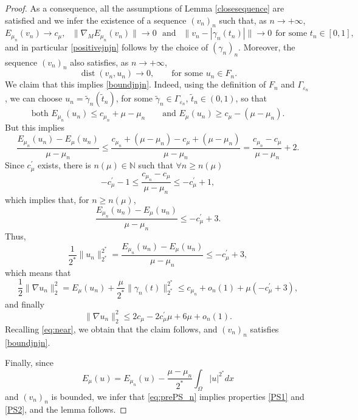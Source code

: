 \documentclass[10pt]{article}
\newcommand{\eps}{\varepsilon}
\DeclareMathOperator{\dist}{dist}
\theoremstyle{definition}
\numberwithin{equation}{section}
\begin{document}
\begin{proof}
As a consequence, all the assumptions of Lemma \ref{closesequence} are satisfied and 
we infer the existence of a sequence $(v_{n})_{n}$ such that, as $n\to+\infty$,
\begin{equation}\label{eq:prePS_n}
E_{\mu_n}(v_{n})\to c_{\mu}, \ \ \ \|\nabla_M E_{\mu_n}(v_{n})\|\to 0 \ \ \ \text{and   } \ \ \|v_{n}-|\gamma_{n}(t_{n})|\| \to 0 \ \ \text{for some } t_{n}\in[0,1],
\end{equation}
and in particular \ref{positivejnjn} follows by the choice of $(\gamma_n)_n$. Moreover, 
the sequence $(v_n)_n$ also satisfies, as $n\to+\infty$,
\begin{equation}\label{eq:near}
\dist(v_{n},u_{n})\to 0,\qquad\text{for some }u_n\in F_n.
\end{equation}
We claim that this implies \ref{boundjnjn}. Indeed, using the  
definition of $F_n$ and $\Gamma_{\eps_n}$, we can choose $u_n=\tilde\gamma_n(\tilde t_n)$, for some 
$\tilde\gamma_n\in \Gamma_{\eps_n}$, $\tilde t_{n}\in(0,1)$, so that
\begin{equation}\label{eq:near2}
\text{both } E_{\mu_n}(u_n) \le c_{\mu_n}+\mu - \mu_n\qquad
\text{and } E_{\mu}(u_n) \ge c_{\mu}-(\mu - \mu_n).
\end{equation}
But this implies
\begin{equation*}
\frac{E_{\mu_{n}}(u_n)-E_{\mu}(u_n)}{\mu-\mu_{n}}\leq \frac{c_{\mu_{n}}+(\mu-\mu_{n})-c_{\mu}+(\mu-\mu_{n})}{\mu-\mu_{n}}=\frac{c_{\mu_{n}}-c_{\mu}}{\mu-\mu_{n}}+2.
\end{equation*}
Since $c_{\mu}^{\prime}$ exists, there is $n(\mu)\in \mathbb{N}$ such that $\forall n\geq n(\mu)$
\begin{equation*}%
-c_{\mu}^{\prime}-1\leq\frac{c_{\mu_{n}}-c_{\mu}}{\mu-\mu_{n}}\leq-c_{\mu}^{\prime}+1,
\end{equation*}
which implies that, for $ n\geq n(\mu)$,
\begin{equation*}
\frac{E_{\mu_{n}}(u_n)-E_{\mu}(u_n)}{\mu-\mu_{n}}\leq-c_{\mu}^{\prime}+3.
\end{equation*}
Thus,
\begin{equation*}
\frac{1}{2^{*}}\|u_n\|_{2^{*}}^{2^{*}}=\frac{E_{\mu_{n}}(u_n)-E_{\mu}(u_n)}{\mu-\mu_{n}}
\leq-c_{\mu}^{\prime}+3,
\end{equation*}
which means that
\begin{equation*}
\frac{1}{2}\|\nabla u_n\|_{2}^{2}= E_{\mu}(u_n)+\frac{\mu}{2^{*}}\|\gamma_{n}(t)\|_{2^{*}}^{2^{*}}
\leq c_{\mu_{n}}+o_n(1)+\mu(-c_{\mu}^{\prime}+3),
\end{equation*}
and finally
\begin{equation*}
\|\nabla u_n\|_{2}^{2} \le 2c_{\mu}-2c^{\prime}_{\mu}\mu+6\mu +o_n(1).
\end{equation*}
Recalling \eqref{eq:near}, we obtain that the claim follows, and $(v_n)_n$ satisfies \ref{boundjnjn}.

Finally, since
\[
E_\mu(u) = E_{\mu_n}(u) - \frac{\mu-\mu_n}{2^*}\int_{\Omega}|u|^{2^{*}}dx
\]
and $(v_n)_n$ is bounded, we infer that \eqref{eq:prePS_n} implies properties \ref{PS1} and \ref{PS2}, 
and the lemma follows.
\end{proof}
\end{document}
